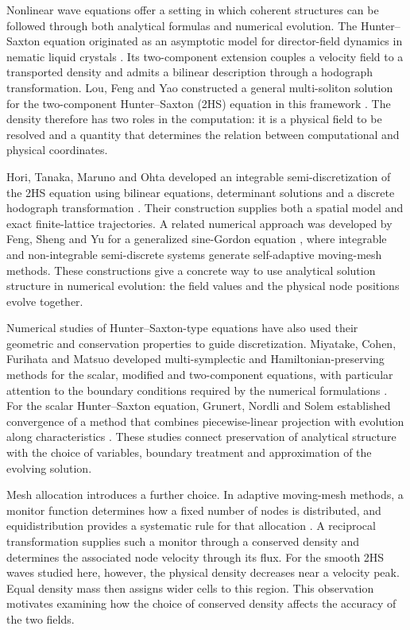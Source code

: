 \documentclass[11pt,a4paper]{article}
\begin{document}
Nonlinear wave equations offer a setting in which coherent structures can be followed through both analytical formulas and numerical evolution. The Hunter--Saxton equation originated as an asymptotic model for director-field dynamics in nematic liquid crystals \cite{hunter1991}. Its two-component extension couples a velocity field to a transported density and admits a bilinear description through a hodograph transformation. Lou, Feng and Yao constructed a general multi-soliton solution for the two-component Hunter--Saxton (2HS) equation in this framework \cite{lou2016}. The density therefore has two roles in the computation: it is a physical field to be resolved and a quantity that determines the relation between computational and physical coordinates.

Hori, Tanaka, Maruno and Ohta developed an integrable semi-discretization of the 2HS equation using bilinear equations, determinant solutions and a discrete hodograph transformation \cite{hori2026}. Their construction supplies both a spatial model and exact finite-lattice trajectories. A related numerical approach was developed by Feng, Sheng and Yu for a generalized sine-Gordon equation \cite{feng2023}, where integrable and non-integrable semi-discrete systems generate self-adaptive moving-mesh methods. These constructions give a concrete way to use analytical solution structure in numerical evolution: the field values and the physical node positions evolve together.

Numerical studies of Hunter--Saxton-type equations have also used their geometric and conservation properties to guide discretization. Miyatake, Cohen, Furihata and Matsuo developed multi-symplectic and Hamiltonian-preserving methods for the scalar, modified and two-component equations, with particular attention to the boundary conditions required by the numerical formulations \cite{miyatake2017}. For the scalar Hunter--Saxton equation, Grunert, Nordli and Solem established convergence of a method that combines piecewise-linear projection with evolution along characteristics \cite{grunert2021}. These studies connect preservation of analytical structure with the choice of variables, boundary treatment and approximation of the evolving solution.

Mesh allocation introduces a further choice. In adaptive moving-mesh methods, a monitor function determines how a fixed number of nodes is distributed, and equidistribution provides a systematic rule for that allocation \cite{huang2011}. A reciprocal transformation supplies such a monitor through a conserved density and determines the associated node velocity through its flux. For the smooth 2HS waves studied here, however, the physical density decreases near a velocity peak. Equal density mass then assigns wider cells to this region. This observation motivates examining how the choice of conserved density affects the accuracy of the two fields.
\end{document}
